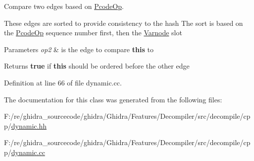 Compare two edges based on \mbox{\hyperlink{class_pcode_op}{Pcode\+Op}}. 

These edges are sorted to provide consistency to the hash The sort is based on the \mbox{\hyperlink{class_pcode_op}{Pcode\+Op}} sequence number first, then the \mbox{\hyperlink{class_varnode}{Varnode}} slot 
\begin{DoxyParams}{Parameters}
{\em op2} & is the edge to compare {\bfseries{this}} to \\
\hline
\end{DoxyParams}
\begin{DoxyReturn}{Returns}
{\bfseries{true}} if {\bfseries{this}} should be ordered before the other edge 
\end{DoxyReturn}


Definition at line 66 of file dynamic.\+cc.



The documentation for this class was generated from the following files\+:\begin{DoxyCompactItemize}
\item 
F\+:/re/ghidra\+\_\+sourcecode/ghidra/\+Ghidra/\+Features/\+Decompiler/src/decompile/cpp/\mbox{\hyperlink{dynamic_8hh}{dynamic.\+hh}}\item 
F\+:/re/ghidra\+\_\+sourcecode/ghidra/\+Ghidra/\+Features/\+Decompiler/src/decompile/cpp/\mbox{\hyperlink{dynamic_8cc}{dynamic.\+cc}}\end{DoxyCompactItemize}
